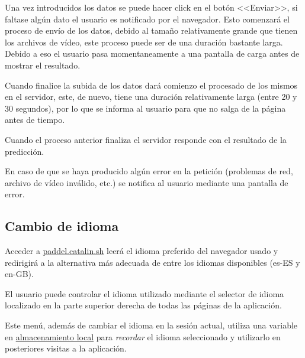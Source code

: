 
Una vez introducidos los datos se puede hacer click en el botón <<Enviar>>, si
faltase algún dato el usuario es notificado por el navegador. Esto comenzará el
proceso de envío de los datos, debido al tamaño relativamente grande que tienen
los archivos de vídeo, este proceso puede ser de una duración bastante larga.
Debido a eso el usuario pasa momentaneamente a una pantalla de carga antes de
mostrar el resultado.


Cuando finalice la subida de los datos dará comienzo el procesado de los mismos
en el servidor, este, de nuevo, tiene una duración relativamente larga (entre 20
y 30 segundos), por lo que se informa al usuario para que no salga de la página
antes de tiempo.


Cuando el proceso anterior finaliza el servidor responde con el resultado de la
predicción.


En caso de que se haya producido algún error en la petición (problemas de red,
archivo de vídeo inválido, etc.) se notifica al usuario mediante una pantalla de
error.


\subsection{Cambio de idioma}

Acceder a \href{https://paddle.catalin.sh}{paddel.catalin.sh} leerá el idioma
preferido del navegador usado y redirigirá a la alternativa más adecuada de
entre los idiomas disponibles (es-ES y en-GB).

El usuario puede controlar el idioma utilizado mediante el selector de idioma
localizado en la parte superior derecha de todas las páginas de la aplicación.


Este menú, además de cambiar el idioma en la sesión actual, utiliza una variable
en
\href{https://developer.mozilla.org/es/docs/Web/API/Window/localStorage}{almacenamiento
local} para \textit{recordar} el idioma seleccionado y utilizarlo en posteriores
visitas a la aplicación.

